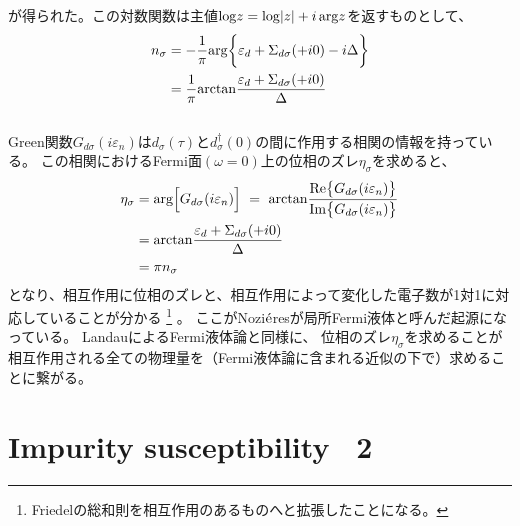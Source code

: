 \documentclass[a4j]{jarticle}
\begin{document}
が得られた。この対数関数は主値${\rm log} z = {\rm log} |z| + i \ \! {\rm arg} z$を返すものとして、
\begin{align}
	n_{\sigma}
	 & =
	- \frac{1}{\pi}
	{\rm arg}
	\bigg\{
	\varepsilon_{d}
	+
	\Sigma_{d\sigma}(+i 0)
	-
	i \Delta
	\bigg\}
	\nonumber \\ &=
	\frac{1}{\pi}
	{\rm arctan}
	\frac{\varepsilon_{d}
		+
		\Sigma_{d\sigma}(+i 0)
	}{
		\Delta
	}
\end{align}

${}$

Green関数$G_{d \sigma}(i \varepsilon_{n})$は$d_{\sigma}(\tau)$と$d^{\dagger}_{\sigma}(0)$の間に作用する相関の情報を持っている。
この相関におけるFermi面$(\omega=0)$上の位相のズレ$\eta_{\sigma}$を求めると、
\begin{align}
	\eta_{\sigma}
	 & =
	{\rm arg}
	\Big[ G_{d \sigma}(i \varepsilon_{n}) \Big]
	\ = \
	{\rm arctan}
	\frac{
		{\rm Re} \big\{ G_{d \sigma}(i \varepsilon_{n}) \big\}
	}{
		{\rm Im} \big\{ G_{d \sigma}(i \varepsilon_{n}) \big\}
	}
	\nonumber \\ &=
	{\rm arctan}
	\frac{
		\varepsilon_{d} + \Sigma_{d \sigma} (+i 0)
	}{
		\Delta
	}
	\nonumber \\ &=
	\pi n_{\sigma}
\end{align}
となり、相互作用に位相のズレと、相互作用によって変化した電子数が1対1に対応していることが分かる
\footnote{
	Friedelの総和則を相互作用のあるものへと拡張したことになる。
}
。
ここがNozi$\acute{\rm e}$resが局所Fermi液体と呼んだ起源になっている。
LandauによるFermi液体論と同様に、
位相のズレ$\eta_{\sigma}$を求めることが
相互作用される全ての物理量を（Fermi液体論に含まれる近似の下で）求めることに繋がる。

\section*{Impurity susceptibility \ 2}
\end{document}
